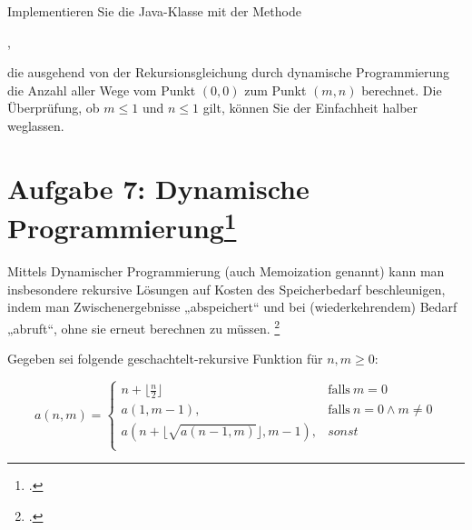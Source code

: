 \documentclass{lehramt-informatik}
\begin{document}
\noindent
Implementieren Sie die Java-Klasse  mit der Methode

\begin{center}
,
\end{center}

\noindent
die ausgehend von der Rekursionsgleichung durch dynamische
Programmierung die Anzahl aller Wege vom Punkt $(0, 0)$ zum Punkt $(m,
n)$ berechnet.
Die Überprüfung, ob $m \leq 1$ und $n \leq 1$ gilt, können Sie der
Einfachheit halber weglassen.

\begin{antwort}
\end{antwort}

%

\section{Aufgabe 7: Dynamische Programmierung\footcite{aud:pu:7}}

Mittels Dynamischer Programmierung (auch Memoization genannt) kann man
insbesondere rekursive Lösungen auf Kosten des Speicherbedarf
beschleunigen, indem man Zwischenergebnisse „abspeichert“ und bei
(wiederkehrendem) Bedarf „abruft“, ohne sie erneut berechnen zu müssen.
\footcite[Staatsexamen AuD/TI, 46115, Herbst 2016, Thema 2, A4]{examen:46115:2016:09}

Gegeben sei folgende geschachtelt-rekursive Funktion für $n, m \geq 0$:

\begin{equation*}
a(n, m) =
\begin{cases}
n + \lfloor \frac{n}{2} \rfloor &
\text{falls}\ m = 0\\

a(1, m-1), &
\text{falls}\ n = 0 \land m \neq 0 \\

a(n + \lfloor \sqrt{a(n-1,m)} \rfloor, m - 1), &
sonst \\
\end{cases}
\end{equation*}
\end{document}
